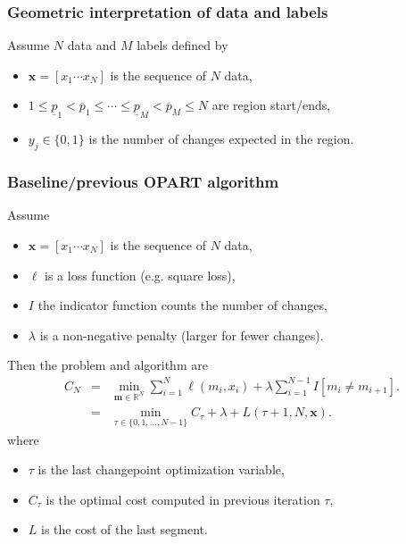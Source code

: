 \documentclass{beamer}
\begin{document}
\begin{frame}
  \frametitle{Geometric interpretation of data and labels}
  Assume $N$ data and $M$ labels defined by
  \begin{itemize}
  \item $\mathbf x = [ x_1 \cdots x_N ]$ is the sequence of $N$ data,
  \item $  1 \leq 
\underline p_1 < \overline p_1 \leq  
\cdots \leq 
\underline p_M < \overline p_M \leq 
N$ are region start/ends,
  \item $y_j\in\{0,1\}$ is the number of changes expected in the region.
  \end{itemize}

     
  
\end{frame}

\begin{frame}
  \frametitle{Baseline/previous OPART algorithm}

  Assume
  \begin{itemize}
  \item $\mathbf x = [ x_1 \cdots x_N ]$ is the sequence of $N$ data,
  \item $\ell$ is a loss function (e.g. square loss),
  \item $I$ the indicator function counts the number of changes,
  \item $\lambda$ is a non-negative penalty (larger for fewer changes).
  \end{itemize}
  Then the problem and algorithm are
  \begin{eqnarray*}
    \label{eq:op}
     C_N &=& \min_{\mathbf m\in \mathbb R^N}
                 \sum_{i=1}^N \ell(m_i, x_i) + 
                 \lambda \sum_{i=1}^{N-1} I[m_i \neq m_{i+1}].\\
             &=& \min_{\tau\in \{0, 1, \dots, N-1\} }
                  C_\tau +
                 \lambda +
                 L(\tau+1, N, \mathbf x).
                 \label{eq:op-update}
  \end{eqnarray*}
  where
  \begin{itemize}
  \item $\tau$ is the last changepoint optimization variable,
  \item $ C_\tau$ is the optimal cost computed in previous iteration $\tau$,
  \item $L$ is the cost of the last segment.
  \end{itemize}

\end{frame}
\end{document}
